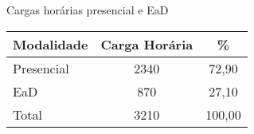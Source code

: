 \begin{quadro}[ht!]
\caption{Cargas horárias presencial e EaD }
\label{quad:ead}
\centering
\begin{tabular}{|l|c|c|}
\hline
\rowcolor{blue1}
 Modalidade &    Carga Horária  & \%\\
\hline
Presencial & 2340 & 72,90 \\
EaD & 870 & 27,10 \\
\hline
Total  & 3210 & 100,00\\\hline
\end{tabular}
\end{quadro}